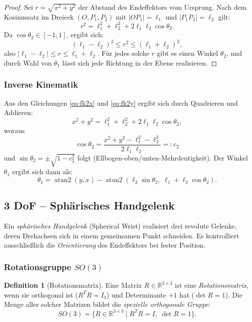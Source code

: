 ﻿\documentclass[a4paper,12pt]{article}
\theoremstyle{definition}
\newtheorem{definition}{Definition}
\begin{document}
\begin{proof}
	Sei $r = \sqrt{x^2 + y^2}$ der Abstand des Endeffektors vom Ursprung. Nach dem Kosinussatz im Dreieck $(O, P_1, P_2)$ mit $|OP_1| = \ell_1$ und $|P_1 P_2| = \ell_2$ gilt:
	\[
		r^2 = \ell_1^2 + \ell_2^2 + 2\ell_1\ell_2\cos\theta_2.
	\]
	Da $\cos\theta_2 \in [-1, 1]$, ergibt sich:
	\[
		(\ell_1 - \ell_2)^2 \leq r^2 \leq (\ell_1 + \ell_2)^2,
	\]
	also $|\ell_1 - \ell_2| \leq r \leq \ell_1 + \ell_2$. Für jedes solche $r$ gibt es einen Winkel $\theta_2$, und durch Wahl von $\theta_1$ lässt sich jede Richtung in der Ebene realisieren. \qedhere
\end{proof}

\subsubsection{Inverse Kinematik}

Aus den Gleichungen \eqref{eq:fk2x} und \eqref{eq:fk2y} ergibt sich durch Quadrieren und Addieren:
\[
	x^2 + y^2 = \ell_1^2 + \ell_2^2 + 2\ell_1\ell_2\cos\theta_2,
\]
woraus
\[
	\cos\theta_2 = \frac{x^2 + y^2 - \ell_1^2 - \ell_2^2}{2\ell_1\ell_2} =: c_2
\]
und $\sin\theta_2 = \pm\sqrt{1 - c_2^2}$ folgt (Ellbogen-oben/unten-Mehrdeutigkeit). Der Winkel $\theta_1$ ergibt sich dann als:
\[
	\theta_1 = \operatorname{atan2}(y, x) - \operatorname{atan2}(\ell_2 \sin\theta_2,\; \ell_1 + \ell_2 \cos\theta_2).
\]

\subsection{3 DoF -- Sphärisches Handgelenk}

Ein \emph{sphärisches Handgelenk} (Spherical Wrist) realisiert drei revolute Gelenke, deren Drehachsen sich in einem gemeinsamen Punkt schneiden. Es kontrolliert ausschließlich die \emph{Orientierung} des Endeffektors bei fester Position.

\subsubsection{Rotationsgruppe $SO(3)$}

\begin{definition}[Rotationsmatrix]
	Eine Matrix $R \in \mathbb{R}^{3\times 3}$ ist eine \emph{Rotationsmatrix}, wenn sie orthogonal ist ($R^T R = I_3$) und Determinante $+1$ hat ($\det R = 1$). Die Menge aller solcher Matrizen bildet die \emph{spezielle orthogonale Gruppe}:
	\[
		SO(3) = \{R \in \mathbb{R}^{3\times 3} \mid R^T R = I,\; \det R = 1\}.
	\]
\end{definition}
\end{document}
